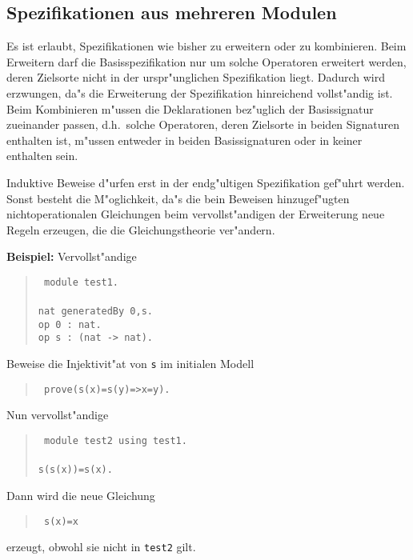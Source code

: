 \subsection{Spezifikationen aus mehreren Modulen}

Es ist erlaubt, Spezifikationen wie bisher zu erweitern
oder zu kombinieren.
Beim Erweitern darf die Basisspezifikation
nur um solche Operatoren erweitert werden, deren Zielsorte nicht in
der urspr"unglichen Spezifikation liegt.
Dadurch wird erzwungen, da"s die Erweiterung der Spezifikation
hinreichend vollst"andig ist.
Beim Kombinieren m"ussen die Deklarationen bez"uglich der
Basissignatur zueinander passen, d.h.\ solche Operatoren, deren
Zielsorte in beiden Signaturen enthalten ist, m"ussen entweder in
beiden Basissignaturen oder in keiner enthalten sein.

Induktive Beweise d"urfen erst in der endg"ultigen Spezifikation gef"uhrt
werden. Sonst besteht die M"oglichkeit, da"s die bein Beweisen hinzugef"ugten
nichtoperationalen Gleichungen beim vervollst"andigen der Erweiterung
neue Regeln erzeugen, die die Gleichungstheorie ver"andern.

\medskip
{\bf Beispiel:} Vervollst"andige
\begin{verse}\tt
module test1.            \\
                         \hfill\\
nat generatedBy 0,s.     \\
op 0 : nat.              \\
op s : (nat -> nat).     \\
\end{verse}

Beweise die Injektivit"at von {\tt s} im initialen Modell
\begin{verse}\tt
prove(s(x)=s(y)=>x=y).
\end{verse}

Nun vervollst"andige
\begin{verse}\tt
module test2 using test1. \\
                          \hfill\\
s(s(x))=s(x).             \\
\end{verse}

Dann wird die neue Gleichung
\begin{verse}\tt
s(x)=x
\end{verse}
erzeugt, obwohl sie nicht in {\tt test2} gilt.


